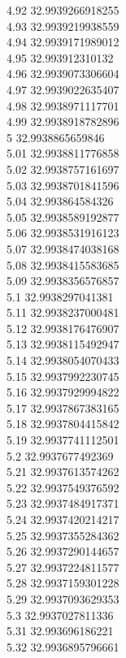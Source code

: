 {4.92	32.9939266918255\\
4.93	32.9939219938559\\
4.94	32.9939171989012\\
4.95	32.993912310132\\
4.96	32.9939073306604\\
4.97	32.9939022635407\\
4.98	32.9938971117701\\
4.99	32.9938918782896\\
5	32.9938865659846\\
5.01	32.9938811776858\\
5.02	32.9938757161697\\
5.03	32.9938701841596\\
5.04	32.993864584326\\
5.05	32.9938589192877\\
5.06	32.9938531916123\\
5.07	32.9938474038168\\
5.08	32.9938415583685\\
5.09	32.9938356576857\\
5.1	32.9938297041381\\
5.11	32.9938237000481\\
5.12	32.9938176476907\\
5.13	32.9938115492947\\
5.14	32.9938054070433\\
5.15	32.9937992230745\\
5.16	32.9937929994822\\
5.17	32.9937867383165\\
5.18	32.9937804415842\\
5.19	32.9937741112501\\
5.2	32.9937677492369\\
5.21	32.9937613574262\\
5.22	32.9937549376592\\
5.23	32.9937484917371\\
5.24	32.9937420214217\\
5.25	32.9937355284362\\
5.26	32.9937290144657\\
5.27	32.9937224811577\\
5.28	32.9937159301228\\
5.29	32.9937093629353\\
5.3	32.9937027811336\\
5.31	32.993696186221\\
5.32	32.9936895796661\\
}
